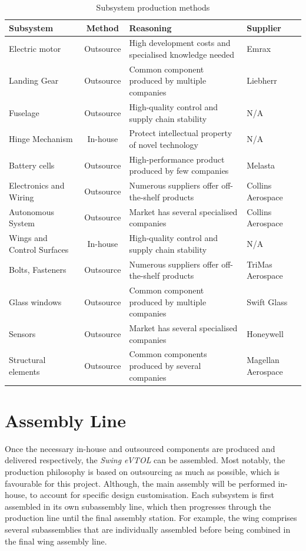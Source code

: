\begin{table}[ht]
\centering
\caption{Subsystem production methods}
\label{prod2}
\begin{tabular}{p{3.2cm}cp{6.5cm}l}
\toprule
\textbf{Subsystem} & \textbf{Method} & \textbf{Reasoning} & \textbf{Supplier} \\ \midrule
Electric motor & Outsource & High development costs and specialised knowledge needed & Emrax \\ \hline
Landing Gear & Outsource & Common component produced by multiple companies & Liebherr \\ \hline
Fuselage & Outsource & High-quality control and supply chain stability & N/A \\ \hline
Hinge Mechanism & In-house & Protect intellectual property of novel technology & N/A \\ \hline
Battery cells & Outsource & High-performance product produced by few companies & Melasta \\ \hline
Electronics and Wiring & Outsource & Numerous suppliers offer off-the-shelf products & Collins Aerospace \\ \hline
Autonomous System & Outsource & Market has several specialised companies & Collins Aerospace \\ \hline
Wings and Control Surfaces & In-house & High-quality control and supply chain stability & N/A \\ \hline
Bolts, Fasteners & Outsource & Numerous suppliers offer off-the-shelf products & TriMas Aerospace \\ \hline 
Glass windows & Outsource & Common component produced by multiple companies & Swift Glass\\ \hline
Sensors & Outsource & Market has several specialised companies & Honeywell \\ \hline
Structural elements & Outsource & Common components produced by several companies & Magellan Aerospace \\\bottomrule
\end{tabular}
\end{table}

\section{Assembly Line}
\label{sec:assem_line}
Once the necessary in-house and outsourced components are produced and delivered respectively, the \textit{Swing eVTOL} can be assembled. 
Most notably, the production philosophy is based on outsourcing as much as possible, which is favourable for this project.
Although, the main assembly will be performed in-house, to account for specific design customisation.
Each subsystem is first assembled in its own subassembly line, which then progresses through the production line until the final assembly station.
For example, the wing comprises several subassemblies that are individually assembled before being combined in the final wing assembly line.

